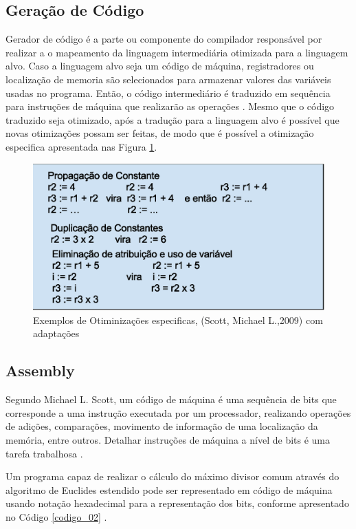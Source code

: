 \subsection{Geração de Código}

Gerador de código é a parte ou componente do compilador responsável por 
realizar a o mapeamento da linguagem intermediária otimizada para a linguagem 
alvo. Caso a linguagem alvo seja um código de máquina,  registradores ou 
localização de memoria são selecionados para armazenar valores das 
variáveis usadas no programa. Então, o código intermediário é traduzido em 
sequência para instruções de máquina que realizarão as operações \cite{ref32}.
Mesmo que o código traduzido seja otimizado, após a tradução para a 
linguagem alvo é  possível que novas otimizações possam ser feitas, de modo 
que é possível a otimização especifica apresentada nas Figura \ref{fig02}.

\begin{figure}[h]
    \centering
        \includegraphics[keepaspectratio=true,scale=0.7]{figuras/otimizacao_especifica.eps}
    \caption{Exemplos de Otiminizações especificas,
             (Scott, Michael L.,2009) com adaptações }
    \label{fig02}
\end{figure}


\subsection{Assembly}

Segundo Michael L. Scott, um código de máquina é uma sequência de bits que
 corresponde a uma instrução executada por um processador, realizando 
operações de adições, comparações, movimento de informação de uma localização
 da memória, entre outros. Detalhar instruções de máquina a nível de bits é 
uma tarefa trabalhosa \cite{ref34}. 

Um programa capaz de realizar o cálculo do máximo divisor comum através do 
algoritmo de Euclides estendido pode ser representado  em código de máquina 
usando notação hexadecimal para a representação dos bits, conforme apresentado
 no Código \ref{codigo_02} \cite{ref34}.


